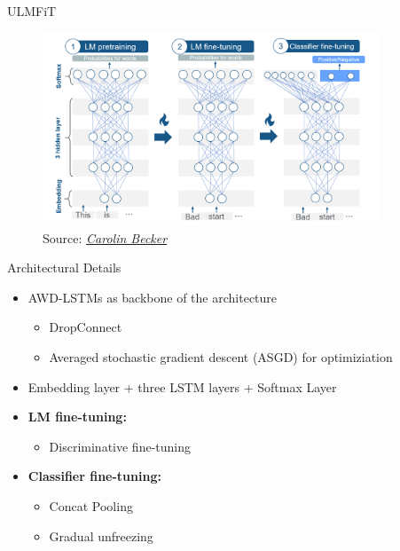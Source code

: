 \begin{vbframe}{ULMFiT \href{https://www.aclweb.org/anthology/P18-1031.pdf}{}}

\vfill

	\begin{figure}
		\centering
		\includegraphics[width = 10cm]{figure/ulmfit-overview-new}\\ 
		\footnotesize{Source:} \href{https://slds-lmu.github.io/seminar_nlp_ss20/transfer-learning-for-nlp-i.html}{\footnotesize \it Carolin Becker}
	\end{figure}

\vfill

\end{vbframe}


\begin{vbframe}{Architectural Details}

\vfill

	\begin{itemize}
		\item AWD-LSTMs \href{https://arxiv.org/pdf/1708.02182.pdf}{} as backbone of the architecture
			\begin{itemize}
				\item DropConnect \href{http://proceedings.mlr.press/v28/wan13.pdf}{}
				\item Averaged stochastic gradient descent (ASGD) for optimiziation
			\end{itemize}
		\item Embedding layer + three LSTM layers + Softmax Layer
		\item \textbf{LM fine-tuning:}
			\begin{itemize}
				\item Discriminative fine-tuning 
			\end{itemize}
		\item \textbf{Classifier fine-tuning:}
			\begin{itemize}
				\item Concat Pooling
				\item Gradual unfreezing
			\end{itemize}
	\end{itemize}

\vfill

\end{vbframe}

